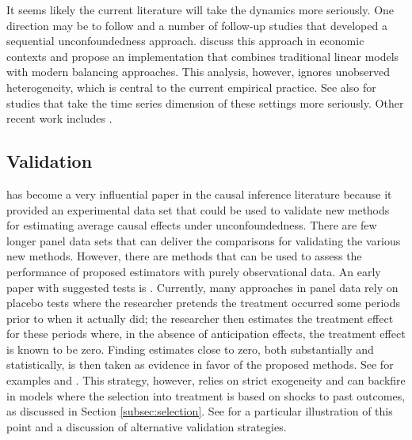 \documentclass[letterpaper,12pt,leqno]{article}
\begin{document}
It seems likely the current literature will take the dynamics more seriously. One direction may be to follow
\citep{robins1986new} and a number of follow-up studies that developed a sequential unconfoundedness approach. \cite{viviano2021dynamic} discuss this approach in economic contexts and propose an implementation that combines traditional linear models with modern balancing approaches. This analysis, however, ignores unobserved heterogeneity, which is central to the current empirical practice. See also \citep{brodersen2015inferring, ben2023estimating, masini2022counterfactual, masini2021counterfactual} for studies that take the time series dimension of these settings more seriously. Other recent work includes \citep{han2020identification, brown2023dynamic}.



\subsection{Validation}

\citep{lalonde1986evaluating} has become a very influential paper in the causal inference literature because it provided an experimental data set that could be used to validate new methods for estimating average causal effects under unconfoundedness. There are few longer panel data sets that can deliver the comparisons for validating the various new methods. However, there are methods that can be used to assess the performance of proposed estimators with purely observational data. 
An early paper with suggested tests is
 \citep{heckman1989choosing}. Currently, many approaches in panel data rely on placebo tests where the researcher pretends the treatment occurred some periods prior to when it actually did; the researcher then estimates the treatment effect for these periods where, in the absence of anticipation effects, the treatment effect is known to be zero. Finding estimates close to zero, both substantially and statistically, is then taken as evidence in favor of the proposed methods. See for examples \citep*{imbensrubinsacerdote} and \citep{abadie2014}. This strategy, however, relies on strict exogeneity and can backfire in models where the selection into treatment is based on shocks to past outcomes, as discussed in Section \ref{subsec:selection}. See \cite{arkhangelsky2023synth} for a particular illustration of this point and a discussion of alternative validation strategies. 
\end{document}
